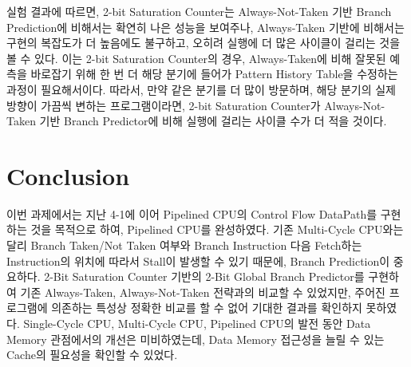 \documentclass[openright, a4paper]{article}
\begin{document}
\hfill

실험 결과에 따르면, 2-bit Saturation Counter는 Always-Not-Taken 기반 Branch
Prediction에 비해서는 확연히 나은 성능을 보여주나, Always-Taken 기반에 비해서는
구현의 복잡도가 더 높음에도 불구하고, 오히려 실행에 더 많은 사이클이 걸리는
것을 볼 수 있다. 이는 2-bit Saturation Counter의 경우, Always-Taken에 비해 잘못된
예측을 바로잡기 위해 한 번 더 해당 분기에 들어가 Pattern History Table을 수정하는
과정이 필요해서이다. 따라서, 만약 같은 분기를 더 많이 방문하며, 해당 분기의 실제
방향이 가끔씩 변하는 프로그램이라면, 2-bit Saturation Counter가 Always-Not-Taken
기반 Branch Predictor에 비해 실행에 걸리는 사이클 수가 더 적을 것이다.


\section{Conclusion}

이번 과제에서는 지난 4-1에 이어 Pipelined CPU의 Control Flow DataPath를 구현하는 것을 목적으로 하여, Pipelined CPU를 완성하였다.
기존 Multi-Cycle CPU와는 달리 Branch Taken/Not Taken 여부와 Branch Instruction 다음 Fetch하는 Instruction의 위치에 따라서 Stall이 발생할 수 있기 때문에, Branch Prediction이 중요하다.
2-Bit Saturation Counter 기반의 2-Bit Global Branch Predictor를 구현하여 기존 Always-Taken, Always-Not-Taken 전략과의 비교할 수 있었지만, 주어진 프로그램에 의존하는 특성상 정확한 비교를 할 수 없어 기대한 결과를 확인하지 못하였다.
Single-Cycle CPU, Multi-Cycle CPU, Pipelined CPU의 발전 동안 Data Memory 관점에서의 개선은 미비하였는데, Data Memory 접근성을 늘릴 수 있는 Cache의 필요성을 확인할 수 있었다.
\end{document}
